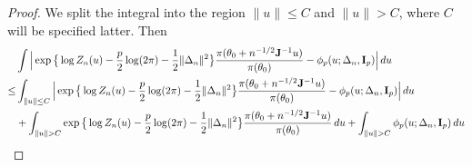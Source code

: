 \documentclass[11pt, letterpaper]{article}
\theoremstyle{plain}
\theoremstyle{definition}
\theoremstyle{remark}
\begin{document}
\begin{proof}
We split the integral into the region $\|u\|\leq C$ and $\|u\|>C$, where $C$ will be specified latter.
Then
\begin{equation}\label{eq:threeTerms}
\begin{aligned}
    &\int \Big|
\exp\big\{\log Z_n(u) -\frac{p}{2}\log (2\pi)-\frac{1}{2}\|\Delta_n\|^2\big\}
\frac{\pi(\theta_0+n^{-1/2} \BJ^{-1}u)}{\pi(\theta_0)}
        -
        \phi_p(u;\Delta_n,\BI_p)
        \Big| \, du
        \\
        \leq &
    \int_{\|u\|\leq C} \Big|
\exp\big\{\log Z_n(u) -\frac{p}{2}\log (2\pi)-\frac{1}{2}\|\Delta_n\|^2\big\}
\frac{\pi(\theta_0+n^{-1/2} \BJ^{-1}u)}{\pi(\theta_0)}
        -
        \phi_p(u;\Delta_n,\BI_p)
        \Big| \, du
        \\
        &+ 
    \int_{\|u\|> C}
\exp\big\{\log Z_n(u) -\frac{p}{2}\log (2\pi)-\frac{1}{2}\|\Delta_n\|^2\big\}
\frac{\pi(\theta_0+n^{-1/2} \BJ^{-1}u)}{\pi(\theta_0)}\, du
        +\int_{\|u\|>C} \phi_p(u;\Delta_n,\BI_p) \, du
        \\
\end{aligned}
\end{equation}


\end{proof}
\end{document}
